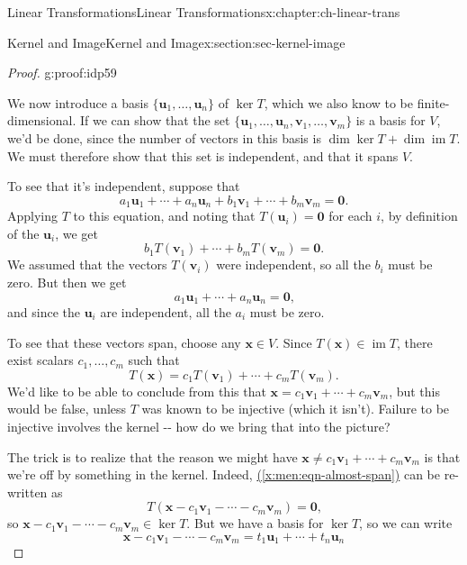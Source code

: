 \documentclass[oneside,10pt,]{book}
\newcommand{\xreffont}{\relax}
\numberwithin{equation}{section}
\newcommand{\im}{\operatorname{im}}
\newcommand{\uu}{\mathbf{u}}
\newcommand{\vv}{\mathbf{v}}
\newcommand{\xx}{\mathbf{x}}
\begin{document}
\begin{chapterptx}{Linear Transformations}{}{Linear Transformations}{}{}{x:chapter:ch-linear-trans}
\begin{sectionptx}{Kernel and Image}{}{Kernel and Image}{}{}{x:section:sec-kernel-image}
\begin{proof}{}{g:proof:idp59}
\par
We now introduce a basis \(\{\uu_1,\ldots, \uu_n\}\) of \(\ker T\), which we also know to be finite-dimensional. If we can show that the set \(\{\uu_1,\ldots, \uu_n,\vv_1,\ldots, \vv_m\}\) is a basis for \(V\), we'd be done, since the number of vectors in this basis is \(\dim\ker T + \dim \im T\). We must therefore show that this set is independent, and that it spans \(V\).%
\par
To see that it's independent, suppose that%
\begin{equation*}
a_1\uu_1+\cdots + a_n\uu_n+b_1\vv_1+\cdots +b_m\vv_m=\mathbf{0}\text{.}
\end{equation*}
Applying \(T\) to this equation, and noting that \(T(\uu_i)=\mathbf{0}\) for each \(i\), by definition of the \(\uu_i\), we get%
\begin{equation*}
b_1T(\vv_1)+\cdots +b_mT(\vv_m)=\mathbf{0}\text{.}
\end{equation*}
We assumed that the vectors \(T(\vv_i)\) were independent, so all the \(b_i\) must be zero. But then we get%
\begin{equation*}
a_1\uu_1+\cdots +a_n\uu_n=\mathbf{0}\text{,}
\end{equation*}
and since the \(\uu_i\) are independent, all the \(a_i\) must be zero.%
\par
To see that these vectors span, choose any \(\xx\in V\). Since \(T(\xx)\in \im T\), there exist scalars \(c_1,\ldots, c_m\) such that%
\begin{equation}
T(\xx)=c_1T(\vv_1)+\cdots +c_mT(\vv_m)\text{.}\label{x:men:eqn-almost-span}
\end{equation}
We'd like to be able to conclude from this that \(\xx=c_1\vv_1+\cdots +c_m\vv_m\), but this would be false, unless \(T\) was known to be injective (which it isn't). Failure to be injective involves the kernel -{}-{} how do we bring that into the picture?%
\par
The trick is to realize that the reason we might have \(\xx\neq c_1\vv_1+\cdots +c_m\vv_m\) is that we're off by something in the kernel. Indeed, \hyperref[x:men:eqn-almost-span]{({\xreffont\ref{x:men:eqn-almost-span}})} can be re-written as%
\begin{equation*}
T(\xx-c_1\vv_1-\cdots -c_m\vv_m) = \mathbf{0}\text{,}
\end{equation*}
so \(\xx-c_1\vv_1-\cdots -c_m\vv_m\in\ker T\). But we have a basis for \(\ker T\), so we can write%
\begin{equation*}
\xx-c_1\vv_1-\cdots -c_m\vv_m=t_1\uu_1+\cdots +t_n\uu_n

\end{equation*}
\end{proof}
\end{sectionptx}
\end{chapterptx}
\end{document}
